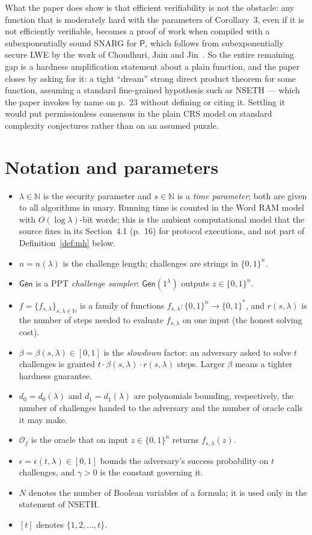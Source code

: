 \documentclass{aicr-conjecture}
\newcommand{\bits}{\{0,1\}}
\newcommand{\NN}{\mathbb{N}}
\newcommand{\Gen}{\mathsf{Gen}}
\newcommand{\Orc}{\mathcal{O}}
\begin{document}
What the paper does show is that efficient verifiability is not the obstacle: any function that is moderately hard with the parameters of Corollary~3, even if it is not efficiently verifiable, becomes a proof of work when compiled with a subexponentially sound SNARG for $\mathsf{P}$, which follows from subexponentially secure LWE by the work of Choudhuri, Jain and Jin~\cite{CJJ21}. So the entire remaining gap is a hardness amplification statement about a plain function, and the paper closes by asking for it: a tight ``dream'' strong direct product theorem for some function, assuming a standard fine-grained hypothesis such as NSETH --- which the paper invokes by name on p.~23 without defining or citing it. Settling it would put permissionless consensus in the plain CRS model on standard complexity conjectures rather than on an assumed puzzle.

\section{Notation and parameters}\label{sec:notation}

\begin{itemize}
\item $\lambda \in \NN$ is the security parameter and $s \in \NN$ is a \emph{time parameter}; both are given to all algorithms in unary. Running time is counted in the Word RAM model with $O(\log \lambda)$-bit words; this is the ambient computational model that the source fixes in its Section~4.1 (p.~16) for protocol executions, and not part of Definition~\ref{def:mh} below.
\item $n = n(\lambda)$ is the challenge length; challenges are strings in $\bits^{n}$.
\item $\Gen$ is a PPT \emph{challenge sampler}: $\Gen(1^{\lambda})$ outputs $z \in \bits^{n}$.
\item $f = \{f_{s,\lambda}\}_{s,\lambda \in \NN}$ is a family of functions $f_{s,\lambda} : \bits^{n} \to \bits^{*}$, and $r(s,\lambda)$ is the number of steps needed to evaluate $f_{s,\lambda}$ on one input (the honest solving cost).
\item $\beta = \beta(s,\lambda) \in [0,1]$ is the \emph{slowdown} factor: an adversary asked to solve $t$ challenges is granted $t \cdot \beta(s,\lambda) \cdot r(s,\lambda)$ steps. Larger $\beta$ means a tighter hardness guarantee.
\item $d_0 = d_0(\lambda)$ and $d_1 = d_1(\lambda)$ are polynomials bounding, respectively, the number of challenges handed to the adversary and the number of oracle calls it may make.
\item $\Orc_f$ is the oracle that on input $z \in \bits^{n}$ returns $f_{s,\lambda}(z)$.
\item $\epsilon = \epsilon(t,\lambda) \in [0,1]$ bounds the adversary's success probability on $t$ challenges, and $\gamma > 0$ is the constant governing it.
\item $N$ denotes the number of Boolean variables of a formula; it is used only in the statement of NSETH.
\item $[t]$ denotes $\{1,2,\dots,t\}$.
\end{itemize}
\end{document}
